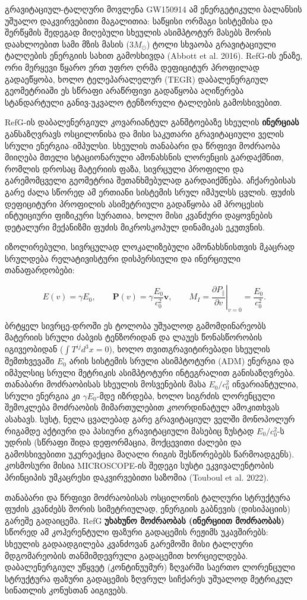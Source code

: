\documentclass[11pt,a4paper]{article}
\begin{document}
გრავიტაციულ-ტალღური მოვლენა GW150914 ამ ენერგეტიკული ბალანსის უშუალო დაკვირვებითი მაგალითია: საწყისი ორმაგი სისტემისა და შერწყმის შედეგად მიღებული სხეულის ასიმპტოტურ მასებს შორის დაახლოებით სამი მზის მასის ($3 M_\odot$) ტოლი სხვაობა გრავიტაციული ტალღების ენერგიის სახით გამოსხივდა (Abbott et al. 2016). RefG-ის ენაზე, ორი მერყევი წყარო ერთ უფრო ღრმა დეფიციტურ პროფილად გადაეწყობა, ხოლო ტელეპარალელურ (TEGR) დაბალენერგიულ გეომეტრიაში ეს სწრაფი არაწრფივი გადაწყობა აღიწერება სტანდარტული განივ-უკვალო ტენზორული ტალღების გამოსხივებით.

RefG-ის დაბალენერგიულ კოვარიანტულ განშტოებაზე სხეულის \textbf{ინერციას} განსაზღვრავს ოსცილონისა და მისი საკუთარი გრავიტაციული ველის სრული ენერგია–იმპულსი. სხეულის თანაბარი და წრფივი მოძრაობა მიიღება მთელი სტაციონარული ამონახსნის ლორენცის გარდაქმნით, რომლის დროსაც მატერიის ფაზა, სივრცული პროფილი და გარემომცველი გეომეტრია შეთანხმებულად გარდაიქმნება. აჩქარებისას გარე ძალა სწორედ ამ ერთიანი სისტემის სრულ იმპულსს ცვლის. ფუძის დეფიციტური პროფილის ასიმეტრიული გადაწყობა ამ პროცესის ინტუიციური ფიზიკური სურათია, ხოლო მისი კვანძური დაყოვნების დეტალური მექანიზმი ფუძის მიკროსკოპულ დინამიკას ეკუთვნის.

იზოლირებული, სივრცულად ლოკალიზებული ამონახსნისთვის მკაცრად სრულდება რელატივისტური დისპერსიული და ინერციული თანაფარდობები:

\[
E(v)=\gamma E_0,\qquad
\mathbf P(v)=\gamma\frac{E_0}{c_0^2}\mathbf v,\qquad
M_I=\left.\frac{\partial P_\parallel}{\partial v}\right|_{v=0}
=\frac{E_0}{c_0^2}.
\]

ბრტყელ სივრცე-დროში ეს ტოლობა უშუალოდ გამომდინარეობს მატერიის სრული ძაბვის ტენზორიდან და ლაუეს წონასწორობის იგივეობიდან ($\int T^{ij}d^3x=0$), ხოლო თვითგრავიტირებადი სხეულის შემთხვევაში $E_0$ არის სისტემის სრული ასიმპტოტური (ADM) ენერგია და იმპულსიც სრული მეტრიკის ასიმპტოტური ინტეგრალით განისაზღვრება. თანაბარი მოძრაობისას სხეულის მოსვენების მასა $E_0/c_0^2$ ინვარიანტულია, სრული ენერგია კი $\gamma E_0$-მდე იზრდება, ხოლო სიგრძის ლორენცული შემოკლება მოძრაობის მიმართულებით კოორდინატულ ამოკითხვას ასახავს. სუსტ, ნელა ცვალებად გარე გრავიტაციულ ველში მონოპოლურ რიგამდე აქტიური და პასიური გრავიტაციული მასებიც ზუსტად $E_0/c_0^2$-ს უდრის (სწრაფი შიდა დეფორმაცია, მოქცევითი ძალები და გამოსხივებითი უკურეაქცია მაღალი რიგის შესწორებებს წარმოადგენს). კოსმოსური მისია MICROSCOPE-ის შედეგი სუსტი ეკვივალენტობის პრინციპის უმკაცრესი დაკვირვებითი საზომია (Touboul et al. 2022).

თანაბარი და წრფივი მოძრაობისას ოსცილონის ტალღური სტრუქტურა ფუძის კვანძებს შორის სიმეტრიულად, ენერგიის გაბნევის (დისიპაციის) გარეშე გადაიცემა. RefG \textbf{უხახუნო მოძრაობას (ინერციით მოძრაობას)} სწორედ ამ კოჰერენტული ფაზური გადაცემის რეჟიმს უკავშირებს: სხეულის გადაადგილება კვანძოვან გარემოში მისი ტალღური მდგომარეობის თანმიმდევრული გადაცემით ხორციელდება. დაბალენერგიულ უწყვეტ (კონტინუუმურ) ზღვარში საერთო ლორენცული სტრუქტურა ფაზური გადაცემის ზღვრულ სიჩქარეს უშუალოდ მეტრიკულ სინათლის კონუსთან აიგივებს.
\end{document}

